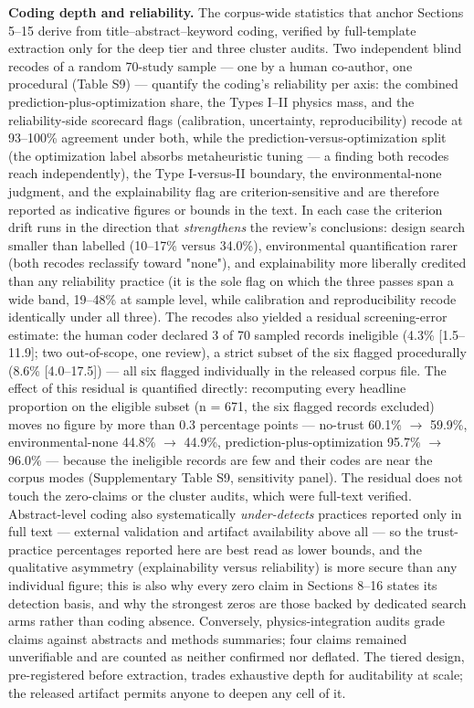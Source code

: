 \documentclass[pdflatex,sn-basic]{sn-jnl}
\begin{document}
\textbf{Coding depth and reliability.} The corpus-wide statistics that anchor Sections 5--15 derive from title--abstract--keyword coding, verified by full-template extraction only for the deep tier and three cluster audits. Two independent blind recodes of a random 70-study sample --- one by a human co-author, one procedural (Table S9) --- quantify the coding's reliability per axis: the combined prediction-plus-optimization share, the Types I--II physics mass, and the reliability-side scorecard flags (calibration, uncertainty, reproducibility) recode at 93--100\% agreement under both, while the prediction-versus-optimization split (the optimization label absorbs metaheuristic tuning --- a finding both recodes reach independently), the Type I-versus-II boundary, the environmental-none judgment, and the explainability flag are criterion-sensitive and are therefore reported as indicative figures or bounds in the text. In each case the criterion drift runs in the direction that \emph{strengthens} the review's conclusions: design search smaller than labelled (10--17\% versus 34.0\%), environmental quantification rarer (both recodes reclassify toward "none"), and explainability more liberally credited than any reliability practice (it is the sole flag on which the three passes span a wide band, 19--48\% at sample level, while calibration and reproducibility recode identically under all three). The recodes also yielded a residual screening-error estimate: the human coder declared 3 of 70 sampled records ineligible (4.3\% [1.5--11.9]; two out-of-scope, one review), a strict subset of the six flagged procedurally (8.6\% [4.0--17.5]) --- all six flagged individually in the released corpus file. The effect of this residual is quantified directly: recomputing every headline proportion on the eligible subset (n = 671, the six flagged records excluded) moves no figure by more than 0.3 percentage points --- no-trust 60.1\% $\rightarrow$ 59.9\%, environmental-none 44.8\% $\rightarrow$ 44.9\%, prediction-plus-optimization 95.7\% $\rightarrow$ 96.0\% --- because the ineligible records are few and their codes are near the corpus modes (Supplementary Table S9, sensitivity panel). The residual does not touch the zero-claims or the cluster audits, which were full-text verified. Abstract-level coding also systematically \emph{under-detects} practices reported only in full text --- external validation and artifact availability above all --- so the trust-practice percentages reported here are best read as lower bounds, and the qualitative asymmetry (explainability versus reliability) is more secure than any individual figure; this is also why every zero claim in Sections 8--16 states its detection basis, and why the strongest zeros are those backed by dedicated search arms rather than coding absence. Conversely, physics-integration audits grade claims against abstracts and methods summaries; four claims remained unverifiable and are counted as neither confirmed nor deflated. The tiered design, pre-registered before extraction, trades exhaustive depth for auditability at scale; the released artifact permits anyone to deepen any cell of it.
\end{document}
